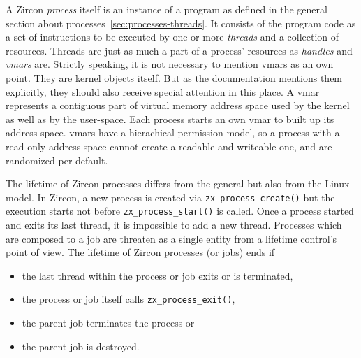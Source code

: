 A Zircon \textit{process} itself is an instance of a program as defined in the general section about processes~\ref{sec:processes-threads}.
It consists of the program code as a set of instructions to be executed by one or more \textit{threads} and a collection of resources.
Threads are just as much a part of a process' resources as \textit{handles} and \textit{\acp{vmar}} are\cite{zircon-process}.
Strictly speaking, it is not necessary to mention \acp{vmar} as an own point.
They are kernel objects itself.
But as the documentation mentions them explicitly, they should also receive special attention in this place.
A \ac{vmar} represents a contiguous part of virtual memory address space used by the kernel as well as by the user-space. 
Each process starts an own \ac{vmar} to built up its address space.
\acp{vmar} have a hierachical permission model, so a process with a read only address space cannot create a readable and writeable one, and are randomized per default\cite{zircon-vmar}.

The lifetime of Zircon processes differs from the general but also from the Linux model.
In Zircon, a new process is created via \texttt{zx\_process\_create()} but the execution starts not before \texttt{zx\_process\_start()} is called.
Once a process started and exits its last thread, it is impossible to add a new thread.
Processes which are composed to a job are threaten as a single entity from a lifetime control's point of view.
The lifetime of Zircon processes (or jobs) ends if 
\begin{itemize}
    \item the last thread within the process or job exits or is terminated,
    \item the process or job itself calls \texttt{zx\_process\_exit()},
    \item the parent job terminates the process or
    \item the parent job is destroyed\cite{zircon-process}.
\end{itemize}

